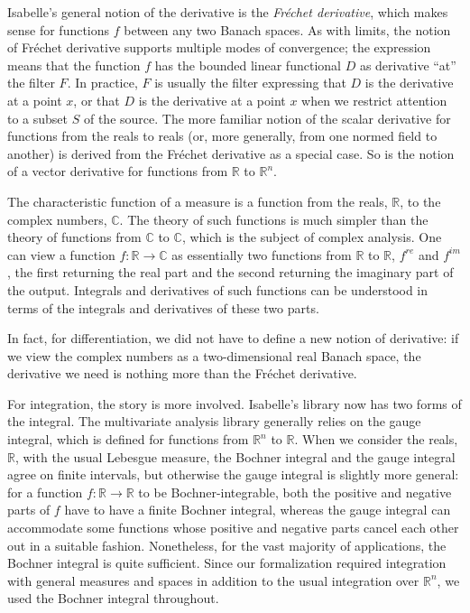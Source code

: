 \documentclass{svjour3}
\newcommand{\RR}{\mathbb{R}}
\newcommand{\CC}{\mathbb{C}}
\begin{document}
Isabelle's general notion of the derivative is the \emph{Fr\'echet derivative}, which makes sense for functions $f$ between any two Banach spaces. As with limits, the notion of Fr\'echet derivative supports multiple modes of convergence; the expression  means that the function $f$ has the bounded linear functional $D$ as derivative ``at'' the filter $F$. In practice, $F$ is usually the filter expressing that $D$ is the derivative at a point $x$, or that $D$ is the derivative at a point $x$ when we restrict attention to a subset $S$ of the source. The more familiar notion of the scalar derivative for functions from the reals to reals (or, more generally, from one normed field to another) is derived from the Fr\'echet derivative as a special case. So is the notion of a vector derivative for functions from $\RR$ to $\RR^n$.

The characteristic function of a measure is a function from the reals, $\RR$, to the complex numbers, $\CC$. The theory of such functions is much simpler than the theory of functions from $\CC$ to $\CC$, which is the subject of complex analysis. One can view a function $f : \RR \to \CC$ as essentially two functions from $\RR$ to $\RR$, $f^\mathit{re}$ and $f^\mathit{im}$, the first returning the real part and the second returning the imaginary part of the output. Integrals and derivatives of such functions can be understood in terms of the integrals and derivatives of these two parts.

In fact, for differentiation, we did not have to define a new notion of derivative: if we view the complex numbers as a two-dimensional real Banach space, the derivative we need is nothing more than the Fr\'echet derivative.

For integration, the story is more involved. Isabelle's library now has two forms of the integral. The multivariate analysis library generally relies on the gauge integral, which is defined for functions from $\RR^n$ to $\RR$. When we consider the reals, $\RR$, with the usual Lebesgue measure, the Bochner integral and the gauge integral agree on finite intervals, but otherwise the gauge integral is slightly more general: for a function $f : \RR \to \RR$ to be Bochner-integrable, both the positive and negative parts of $f$ have to have a finite Bochner integral, whereas the gauge integral can accommodate some functions whose positive and negative parts cancel each other out in a suitable fashion. Nonetheless, for the vast majority of applications, the Bochner integral is quite sufficient. Since our formalization required integration with general measures and spaces in addition to the usual integration over $\RR^n$, we used the Bochner integral throughout.
\end{document}
